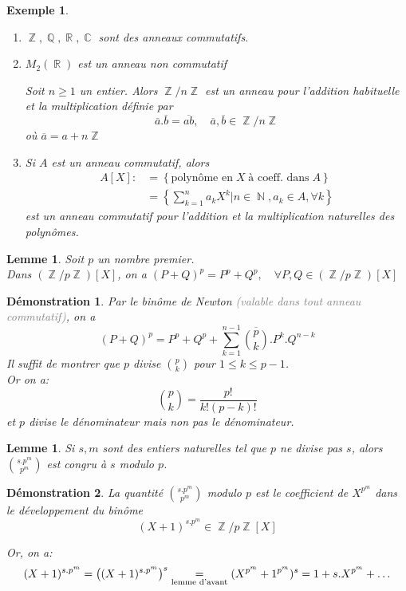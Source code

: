 \documentclass[a4paper, oneside]{report}
\theoremstyle{break}
\newtheorem{lemme}[thm]{Lemme}
\newtheorem{exemple}[thm]{Exemple}
\newtheorem*{demonstration}{Démonstration}
\newcommand{\gray}[1]{\textcolor{gray}{#1}}
\DeclareMathOperator{\R}{\mathbb{R}}
\DeclareMathOperator{\N}{\mathbb{N}}
\DeclareMathOperator{\C}{\mathbb{C}}
\DeclareMathOperator{\Z}{\mathbb{Z}}
\DeclareMathOperator{\Q}{\mathbb{Q}}
\DeclarePairedDelimiter\ens{\left\{ }{\right\} }%
\DeclarePairedDelimiter\pa{\big(}{\big)}%
\renewcommand{\ens}[1]{\left\{ #1 \right\} }%
\newcommand{\us}{\underset}
\newcommand{\ol}{\overline}
\newcommand{\ensem}{\ens}
\begin{document}
\begin{exemple}
\begin{enumerate}
\item  $\Z, \Q, \R, \C$ sont des anneaux commutatifs.

\medbreak

\item $M_2(\R)$ est un anneau non commutatif

\medbreak

Soit $n \geq 1$ un entier. Alors $\Z/n\Z$ est un anneau pour l'addition habituelle et la multiplication définie par 
\[
\ol{a} . \ol{b} = \ol{ab},		\quad	\ol{a}, \ol{b} \in \Z/n\Z
\]
où $\ol{a} = a + n \Z$

\bigbreak

\item Si $A$ est un anneau commutatif, alors
\begin{align*}
A[X] :&= \ens{\text{polynôme en} \; X \; \text{à coeff. dans} \; A}
\\
&= \ensem{\sum_{k = 1}^n a_k X^k \big| n \in \N, a_k \in A, \forall k}
\end{align*}
est un anneau commutatif pour l'addition et la multiplication naturelles des polynômes.
\end{enumerate}
\end{exemple}

\begin{lemme}
Soit $p$ un nombre premier.\\
Dans $(\Z/p\Z)[X]$, on a $(P + Q)^p = P^p + Q^p,	\quad	\forall P, Q \in (\Z/p\Z)[X]$
\end{lemme}

\begin{demonstration}
Par le binôme de Newton \gray{(valable dans tout anneau commutatif)}, on a 
\[
(P + Q)^p = P^p + Q^p + \sum_{k = 1}^{n-1} \ol{\binom{p}{k}} . P^k . Q^{n-k}
\]
Il suffit de montrer que $p$ divise $\binom{p}{k}$ pour $1 \leq k \leq p - 1$.\\
Or on a:
\[
\binom{p}{k} = \frac{p!}{k! (p-k)!}
\]
et $p$ divise le dénominateur mais non pas le dénominateur.
\end{demonstration}

\begin{lemme}
Si $s, m$ sont des entiers naturelles tel que $p$ ne divise pas $s$, alors $\binom{s.p^m}{p^m}$ est congru à $s$ modulo $p$.
\end{lemme}

\begin{demonstration}
La quantité $\binom{s.p^m}{p^m}$ modulo $p$ est le coefficient de $X^{p^m}$ dans le développement du binôme 
\[
(X + 1)^{s.p^m} \in \Z/p\Z[X]
\]

Or, on a:
\[
(X + 1)^{s.p^m} = \pa{(X+1)^{s.p^m}}^s \us{\text{lemme d'avant}}{=} (X^{p^m} + 1^{p^m})^s = 1 + s.X^{p^m} + \ldots 
\]
\end{demonstration}
\end{document}
